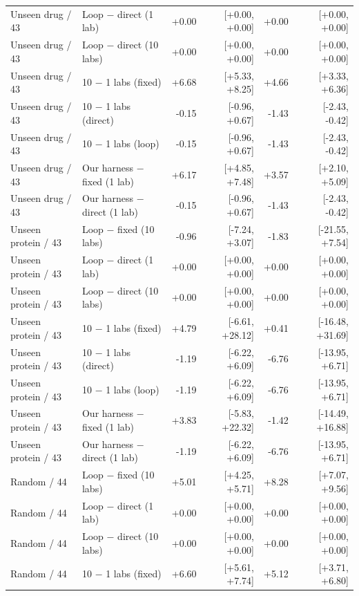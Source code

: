 \begin{longtable}{llrrrr}
Unseen drug / 43 & Loop $-$ direct (1 lab) & +0.00 & [+0.00, +0.00] & +0.00 & [+0.00, +0.00] \\
Unseen drug / 43 & Loop $-$ direct (10 labs) & +0.00 & [+0.00, +0.00] & +0.00 & [+0.00, +0.00] \\
Unseen drug / 43 & 10 $-$ 1 labs (fixed) & +6.68 & [+5.33, +8.25] & +4.66 & [+3.33, +6.36] \\
Unseen drug / 43 & 10 $-$ 1 labs (direct) & -0.15 & [-0.96, +0.67] & -1.43 & [-2.43, -0.42] \\
Unseen drug / 43 & 10 $-$ 1 labs (loop) & -0.15 & [-0.96, +0.67] & -1.43 & [-2.43, -0.42] \\
Unseen drug / 43 & Our harness $-$ fixed (1 lab) & +6.17 & [+4.85, +7.48] & +3.57 & [+2.10, +5.09] \\
Unseen drug / 43 & Our harness $-$ direct (1 lab) & -0.15 & [-0.96, +0.67] & -1.43 & [-2.43, -0.42] \\
\midrule
Unseen protein / 43 & Loop $-$ fixed (10 labs) & -0.96 & [-7.24, +3.07] & -1.83 & [-21.55, +7.54] \\
Unseen protein / 43 & Loop $-$ direct (1 lab) & +0.00 & [+0.00, +0.00] & +0.00 & [+0.00, +0.00] \\
Unseen protein / 43 & Loop $-$ direct (10 labs) & +0.00 & [+0.00, +0.00] & +0.00 & [+0.00, +0.00] \\
Unseen protein / 43 & 10 $-$ 1 labs (fixed) & +4.79 & [-6.61, +28.12] & +0.41 & [-16.48, +31.69] \\
Unseen protein / 43 & 10 $-$ 1 labs (direct) & -1.19 & [-6.22, +6.09] & -6.76 & [-13.95, +6.71] \\
Unseen protein / 43 & 10 $-$ 1 labs (loop) & -1.19 & [-6.22, +6.09] & -6.76 & [-13.95, +6.71] \\
Unseen protein / 43 & Our harness $-$ fixed (1 lab) & +3.83 & [-5.83, +22.32] & -1.42 & [-14.49, +16.88] \\
Unseen protein / 43 & Our harness $-$ direct (1 lab) & -1.19 & [-6.22, +6.09] & -6.76 & [-13.95, +6.71] \\
\midrule
Random / 44 & Loop $-$ fixed (10 labs) & +5.01 & [+4.25, +5.71] & +8.28 & [+7.07, +9.56] \\
Random / 44 & Loop $-$ direct (1 lab) & +0.00 & [+0.00, +0.00] & +0.00 & [+0.00, +0.00] \\
Random / 44 & Loop $-$ direct (10 labs) & +0.00 & [+0.00, +0.00] & +0.00 & [+0.00, +0.00] \\
Random / 44 & 10 $-$ 1 labs (fixed) & +6.60 & [+5.61, +7.74] & +5.12 & [+3.71, +6.80] \\

\end{longtable}
